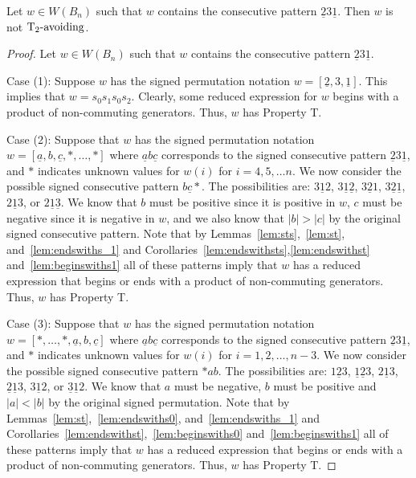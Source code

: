 \begin{lemma}\label{lem:2312}
Let $w \in W(B_n)$ such that $w$ contains the consecutive pattern $\underline{2}3\underline{1}$. Then $w$ is not $\operatorname{T_2-\mathrm{avoiding}}$.
\begin{proof}
	Let $w \in W(B_n)$ such that $w$ contains the consecutive pattern $\underline{2}3\underline{1}$.
	
	Case (1): Suppose $w$ has the signed permutation notation $w=[\underline{2},3,\underline{1}]$. This implies that $w=s_0s_1s_0s_2$. Clearly, some reduced expression for $w$ begins with a product of non-commuting generators. Thus, $w$ has Property T.
	
	Case (2): Suppose that $w$ has the signed permutation notation $w=[\underline{a},b,\underline{c}, \ast, \ldots, \ast]$ where $\underline{a}b\underline{c}$ corresponds to the signed consecutive pattern $\underline{2}3\underline{1}$, and $\ast$ indicates unknown values for $w(i)$ for $i=4,5, \ldots n$. We now consider the possible signed consecutive pattern $b \underline{c} \ast$. The possibilities are: $3\underline{1}2$, $3\underline{1}\underline{2}$, $3\underline{2}1$, $3 \underline{2}\underline{1}$, $2\underline{1}3$, or $2\underline{1}\underline{3}$. We know that $b$ must be positive since it is positive in $w$, $c$ must be negative since it is negative in $w$, and we also know that $|b|>|c|$ by the original signed consecutive pattern. Note that by Lemmas~\ref{lem:sts},~\ref{lem:st}, and~\ref{lem:endswiths_1} and Corollaries~\ref{lem:endswithsts},\ref{lem:endswithst} and~\ref{lem:beginswiths1} all of these patterns imply that $w$ has a reduced expression that begins or ends with a product of non-commuting generators. Thus, $w$ has Property T.
	
	Case (3): Suppose that $w$ has the signed permutation notation $w=[\ast, \ldots, \ast, \underline{a},b,\underline{c}]$ where $\underline{a}b\underline{c}$ corresponds to the signed consecutive pattern $\underline{2}3\underline{1}$, and $\ast$ indicates unknown values for $w(i)$ for $i=1,2, \ldots ,n-3$. We now consider the possible signed consecutive pattern $\ast ab$. The possibilities are: $1 \underline{2} 3$, $\underline{1} \underline{2} 3$, $2 \underline{1} 3$, $\underline{2} \underline{1} 3$, $3 \underline{1} 2$, or $\underline{3} \underline{1} 2$. We know that $a$ must be negative, $b$ must be positive and $|a|<|b|$ by the original signed permutation. Note that by Lemmas~\ref{lem:st},~\ref{lem:endswiths0}, and~\ref{lem:endswiths_1} and Corollaries~\ref{lem:endswithst},~\ref{lem:beginswiths0} and~\ref{lem:beginswiths1} all of these patterns imply that $w$ has a reduced expression that begins or ends with a product of non-commuting generators. Thus, $w$ has Property T. 


\end{proof}
\end{lemma}
